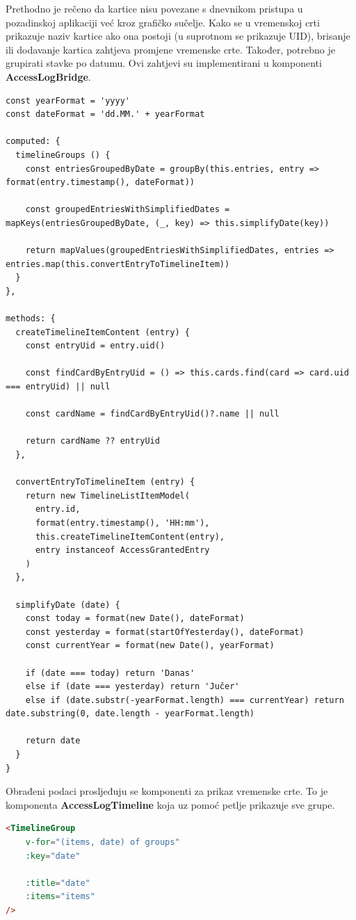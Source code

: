 Prethodno je rečeno da kartice nisu povezane s dnevnikom pristupa u pozadinskoj aplikaciji već kroz grafičko sučelje.
Kako se u vremenskoj crti prikazuje naziv kartice ako ona postoji (u suprotnom se prikazuje UID), brisanje ili dodavanje
kartica zahtjeva promjene vremenske crte.
Također, potrebno je grupirati stavke po datumu.
Ovi zahtjevi su implementirani u komponenti \textbf{AccessLogBridge}.

\begin{lstlisting}
const yearFormat = 'yyyy'
const dateFormat = 'dd.MM.' + yearFormat

computed: {
  timelineGroups () {
    const entriesGroupedByDate = groupBy(this.entries, entry => format(entry.timestamp(), dateFormat))

    const groupedEntriesWithSimplifiedDates = mapKeys(entriesGroupedByDate, (_, key) => this.simplifyDate(key))

    return mapValues(groupedEntriesWithSimplifiedDates, entries => entries.map(this.convertEntryToTimelineItem))
  }
},

methods: {
  createTimelineItemContent (entry) {
    const entryUid = entry.uid()

    const findCardByEntryUid = () => this.cards.find(card => card.uid === entryUid) || null

    const cardName = findCardByEntryUid()?.name || null

    return cardName ?? entryUid
  },

  convertEntryToTimelineItem (entry) {
    return new TimelineListItemModel(
      entry.id,
      format(entry.timestamp(), 'HH:mm'),
      this.createTimelineItemContent(entry),
      entry instanceof AccessGrantedEntry
    )
  },

  simplifyDate (date) {
    const today = format(new Date(), dateFormat)
    const yesterday = format(startOfYesterday(), dateFormat)
    const currentYear = format(new Date(), yearFormat)

    if (date === today) return 'Danas'
    else if (date === yesterday) return 'Jučer'
    else if (date.substr(-yearFormat.length) === currentYear) return date.substring(0, date.length - yearFormat.length)

    return date
  }
}
\end{lstlisting}

Obrađeni podaci prosljeđuju se komponenti za prikaz vremenske crte.
To je komponenta \textbf{AccessLogTimeline} koja uz pomoć petlje prikazuje sve grupe.

\begin{lstlisting}[language=HTML]
<TimelineGroup
    v-for="(items, date) of groups"
    :key="date"

    :title="date"
    :items="items"
/>
\end{lstlisting}

